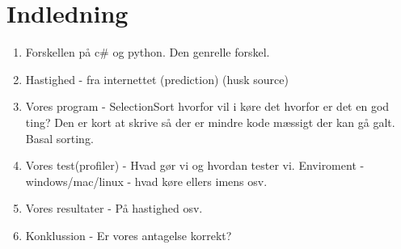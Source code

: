 \documentclass[class=report, crop=false]{standalone}
\begin{document}
    \section{Indledning}
    \begin{enumerate}
        \item Forskellen på c\# og python. Den genrelle forskel.
        \item Hastighed -\> fra internettet (prediction) (husk source)
        \item Vores program -\> SelectionSort hvorfor vil i køre det hvorfor er det en god ting? Den er kort at skrive så der er mindre kode mæssigt der kan gå galt. Basal sorting.
        \item Vores test(profiler) -\> Hvad gør vi og hvordan tester vi. Enviroment - windows/mac/linux - hvad køre ellers imens osv.
        \item Vores resultater -\> På hastighed osv.
        \item Konklussion -\> Er vores antagelse korrekt?
    \end{enumerate}
\end{document}

